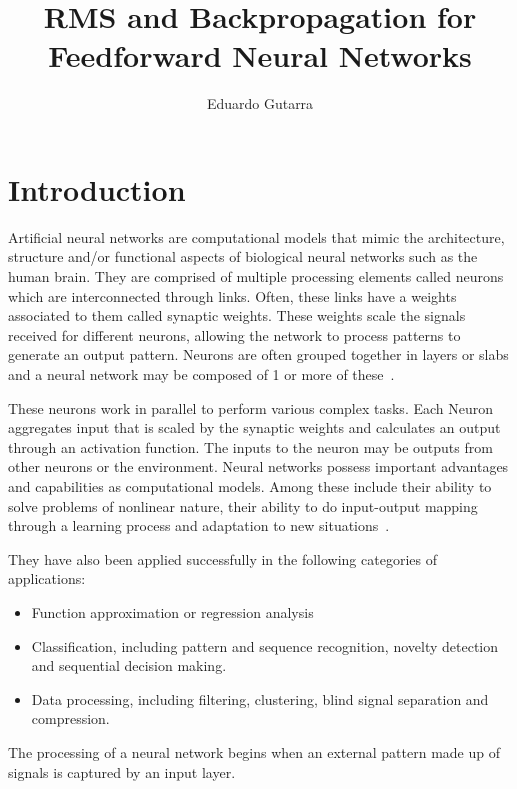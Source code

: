 \documentclass[11pt]{article}
\title{RMS and Backpropagation for Feedforward Neural Networks}
\author{Eduardo Gutarra}
\begin{document}
	
\ifpdf
{}
\else
{}
\fi
	
\maketitle
	
\section{Introduction} %
\label{sec:introduction}

Artificial neural networks are computational models that mimic the architecture, structure and/or functional aspects of biological
neural networks such as the human brain. They are comprised of multiple processing elements called neurons which are interconnected
through links. Often, these links have a weights associated to them called synaptic weights. These weights scale the signals received
for different neurons, allowing the network to process patterns to generate an output pattern. Neurons are often grouped together in
layers or slabs and a neural network may be composed of 1 or more of these~\cite{skapura}.

These neurons work in parallel to perform various complex tasks. Each Neuron aggregates input that is scaled by the synaptic weights and
calculates an output through an activation function. The inputs to the neuron may be outputs from other neurons or the environment.
Neural networks possess important advantages and capabilities as computational models. Among these include their ability to solve
problems of nonlinear nature, their ability to do input-output mapping through a learning process and adaptation to new
situations~\cite{Haykin:1994:NNC:541500}.

They have also been applied successfully in the following categories of applications:

\begin{itemize}
\item Function approximation or regression analysis
\item Classification, including pattern and sequence recognition, novelty detection and sequential decision making.
\item Data processing, including filtering, clustering, blind signal separation and compression.
\end{itemize}

The processing of a neural network begins when an external pattern made up of signals is captured by an input layer.
\end{document}
